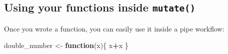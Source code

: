 \documentclass[]{gitbook}
\newenvironment{Shaded}{\begin{snugshade}}{\end{snugshade}}
\newcommand{\ControlFlowTok}[1]{\textcolor[rgb]{0.13,0.29,0.53}{\textbf{#1}}}
\newcommand{\DataTypeTok}[1]{\textcolor[rgb]{0.13,0.29,0.53}{#1}}
\newcommand{\KeywordTok}[1]{\textcolor[rgb]{0.13,0.29,0.53}{\textbf{#1}}}
\newcommand{\NormalTok}[1]{#1}
\newcommand{\OperatorTok}[1]{\textcolor[rgb]{0.81,0.36,0.00}{\textbf{#1}}}
\newcommand{\StringTok}[1]{\textcolor[rgb]{0.31,0.60,0.02}{#1}}
\theoremstyle{definition}
\theoremstyle{definition}
\theoremstyle{definition}
\theoremstyle{remark}
\begin{document}
\hypertarget{using-your-functions-inside-mutate}{%
\subsection{\texorpdfstring{Using your functions inside
\texttt{mutate()}}{Using your functions inside mutate()}}\label{using-your-functions-inside-mutate}}

Once you wrote a function, you can easily use it inside a pipe workflow:

\begin{Shaded}
\begin{Highlighting}[]
\NormalTok{double_number <-}\StringTok{ }\ControlFlowTok{function}\NormalTok{(x)\{}
\NormalTok{  x}\OperatorTok{+}\NormalTok{x}
\NormalTok{\}}
\end{Highlighting}
\end{Shaded}

\begin{Shaded}
\end{Shaded}
\end{document}
